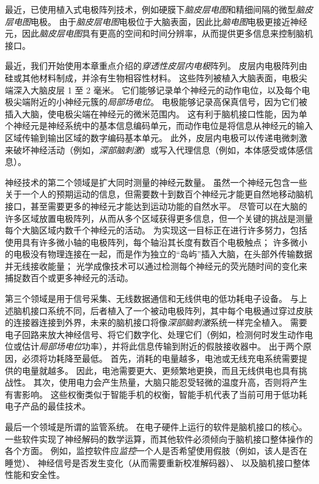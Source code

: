 最近，已使用植入式电极阵列技术，例如硬膜下\textit{脑皮层电图}和精细间隔的微型\textit{脑皮层电图}电极。
由于\textit{脑皮层电图}电极位于大脑表面，因此比\textit{脑电图}电极更接近神经元，因此\textit{脑皮层电图}具有更高的空间和时间分辨率，从而提供更多信息来控制脑机接口。


最近，我们开始使用本章重点介绍的\textit{穿透性皮层内电极}阵列。
皮层内电极阵列由硅或其他材料制成，并涂有生物相容性材料。
这些阵列被植入大脑表面，电极尖端深入大脑皮层 1 至 2 毫米。
它们能够记录单个神经元的动作电位，以及每个电极尖端附近的小神经元簇的\textit{局部场电位}。
电极能够记录高保真信号，因为它们被插入大脑，使电极尖端在神经元的微米范围内。
这有利于脑机接口性能，因为单个神经元是神经系统中的基本信息编码单元，而动作电位是将信息从神经元的输入区域传输到输出区域的数字编码基本单元。
此外，皮层内电极可以传递电微刺激来破坏神经活动（例如，\textit{深部脑刺激}）或写入代理信息（例如，本体感受或体感信息）。


神经技术的第二个领域是扩大同时测量的神经元数量。
虽然一个神经元包含一些关于一个人的预期运动的信息，但需要数十到数百个神经元才能更自然地移动脑机接口，甚至需要更多的神经元才能达到运动功能的自然水平。
尽管可以在大脑的许多区域放置电极阵列，从而从多个区域获得更多信息，但一个关键的挑战是测量每个大脑区域内数千个神经元的活动。
为实现这一目标正在进行许多努力，包括使用具有许多微小轴的电极阵列，每个轴沿其长度有数百个电极触点；
许多微小的电极没有物理连接在一起，而是作为独立的“岛屿”插入大脑，在头部外传输数据并无线接收能量；
光学成像技术可以通过检测每个神经元的荧光随时间的变化来捕捉数百个或更多神经元的活动。


第三个领域是用于信号采集、无线数据通信和无线供电的低功耗电子设备。
与上述脑机接口系统不同，后者植入了一个被动电极阵列，其中每个电极通过穿过皮肤的连接器连接到外界，未来的脑机接口将像\textit{深部脑刺激}系统一样完全植入。
需要电子回路来放大神经信号、将它们数字化、处理它们（例如，检测何时发生动作电位或估计\textit{局部场电位}功率），并将此信息传输到附近的假肢接收器中。
出于两个原因，必须将功耗降至最低。
首先，消耗的电量越多，电池或无线充电系统需要提供的电量就越多。
因此，电池需要更大、更频繁地更换，而且无线供电也具有挑战性。
其次，使用电力会产生热量，大脑只能忍受轻微的温度升高，否则将产生有害影响。
这些权衡类似于智能手机的权衡，智能手机代表了当前可用于低功耗电子产品的最佳技术。


最后一个领域是所谓的监管系统。
在电子硬件上运行的软件是脑机接口的核心。 
一些软件实现了神经解码的数学运算，而其他软件必须倾向于脑机接口整体操作的各个方面。
例如，监控软件应\textit{监控}一个人是否希望使用假肢（例如，该人是否在睡觉）、
神经信号是否发生变化（从而需要重新校准解码器）、
以及脑机接口整体性能和安全性。


